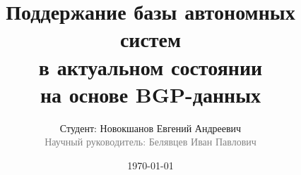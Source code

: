 \title[BGP AS mapping]{Поддержание базы автономных систем\\в актуальном состоянии\\на основе BGP-данных}
\subtitle{}
\author[Новокшанов Е.А.]{Студент: Новокшанов Евгений Андреевич\\{\footnotesize\textcolor{gray}{Научный руководитель: Белявцев Иван Павлович}}}
\date{\today}
